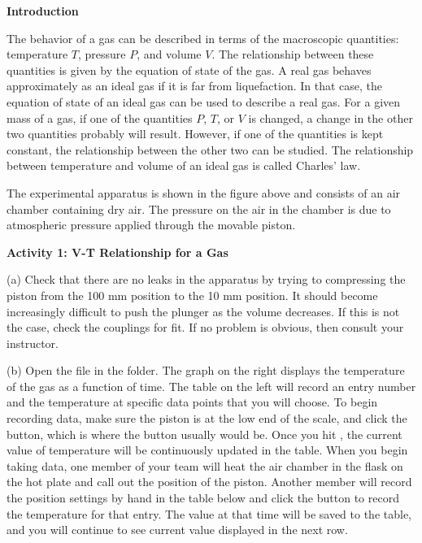 \textbf{Introduction}

The behavior of a gas can be described in terms of the macroscopic quantities:
temperature $T$, pressure $P$, and volume $V$. The relationship between these
quantities is given by the equation of state of the gas. A real gas behaves
approximately as an ideal gas if it is far from liquefaction. In that case,
the equation of state of an ideal gas can be used to describe a real gas. For
a given mass of a gas, if one of the quantities $P$, $T$, or $V$ is changed, a change
in the other two quantities probably will result. However, if one of the quantities
is kept constant, the relationship between the other two can be studied. The
relationship between temperature and volume of an ideal gas is called Charles' law.

The experimental apparatus is shown in the figure above and consists
of an air chamber containing dry air. The pressure on the air in the chamber is due to atmospheric
pressure applied through the movable piston.

\textbf{Activity 1: V-T Relationship for a Gas} \nopagebreak

(a) Check that there are no leaks in the apparatus by trying to compressing
the piston from the 100 mm position to the 10 mm position. It should become
increasingly difficult to push the plunger as the volume decreases. If this
is not the case, check the couplings for fit. If no problem is obvious, then
consult your instructor. 

(b) Open the file  in the \filename{\coursefolder} folder.
The graph on the right displays the temperature of the gas as a function of time.  
The table on the left will record an entry number and the temperature at specific data points that you will choose. 
To begin recording data, make sure the piston is at the low end of the scale, and click
the  button, which is where the  button usually would be. 
Once you hit , the current value of temperature will be continuously updated in the table. When you begin taking data, one member of your team will heat the air chamber in the flask on the hot plate 
and call out the position of the piston.
Another member will record the position settings by hand in the table below
and
click the  button to record the 
temperature for that entry.
The value at that time will be saved to the table, and you will continue to see current value displayed in the next row.



